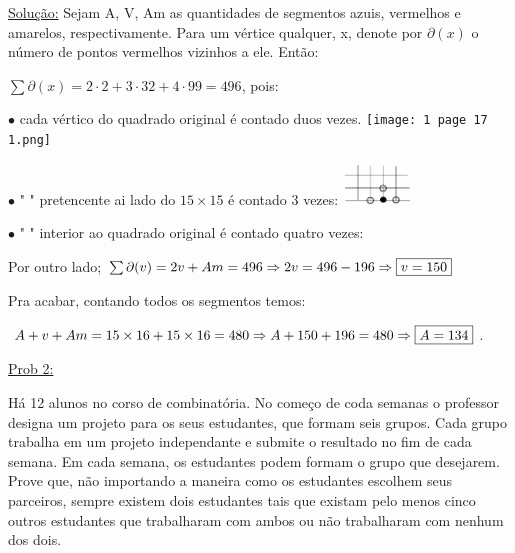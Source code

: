 \documentclass[a4paper,12pt]{article}
\theoremstyle{plain} %
\theoremstyle{definition} %
\theoremstyle{remark} %
\begin{document}
	\begin{framed}
		\underline{Solu\c{c}\~ao:} Sejam A, V, Am as quantidades de segmentos azuis, vermelhos e amarelos, respectivamente. Para um v\'ertice qualquer, x, denote por $\partial(x)$ o n\'umero de pontos vermelhos vizinhos a ele. Ent\~ao:
		
		$\sum \partial (x)=2\cdot 2+3\cdot 32+ 4\cdot 99=496$, pois:
		
		$\bullet$ cada v\'ertico do quadrado original \'e contado duos vezes. \texttt{[image: 1 page 17 1.png]}
		
		$\bullet$ \hspace{1em} " \hspace{3em} " \hspace{3em} pretencente ai lado do $15\times 15$ \'e contado 3 vezes: \includegraphics[height=3em]{1 page 17 2.png}
		
		$\bullet$ \hspace{1em} " \hspace{3em} " \hspace{3em} interior ao quadrado original \'e contado quatro vezes: 
		
		Por outro lado; $\sum \partial (v)=2v+Am=496\Rightarrow2v=496-196\Rightarrow \fbox{$v=150$}$
		
		Pra acabar, contando todos os segmentos temos:
		
		$A+v+Am=15\times 16+15\times 16=480\Rightarrow A+150+196=480\Rightarrow \fbox{$A=134$}$. \tiny\textblock 
	\end{framed}
	
	\normalsize
	
	\vspace{2ex}\underline{Prob 2:}
	
	H\'a 12 alunos no corso de combinat\'oria. No come\c{c}o de coda semanas o professor designa um projeto para os seus estudantes, que formam seis grupos. Cada grupo trabalha em um projeto independante e submite o resultado no fim de cada semana. Em cada semana, os estudantes podem formam o grupo que desejarem. Prove que, n\~ao importando a maneira como os estudantes escolhem seus parceiros, sempre existem dois estudantes tais que existam pelo menos cinco outros estudantes que trabalharam com ambos ou n\~ao trabalharam com nenhum dos dois.
	
\end{document}
